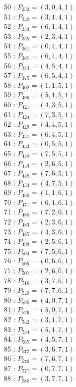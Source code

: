 \documentclass{article}
\begin{document}
{\begin{multicols}{3}
50 : $P_{332}=( 3, 0, 4, 1 )$\\
51 : $P_{340}=( 3, 1, 4, 1 )$\\
52 : $P_{343}=( 6, 1, 4, 1 )$\\
53 : $P_{355}=( 2, 3, 4, 1 )$\\
54 : $P_{361}=( 0, 4, 4, 1 )$\\
55 : $P_{367}=( 6, 4, 4, 1 )$\\
56 : $P_{373}=( 4, 5, 4, 1 )$\\
57 : $P_{375}=( 6, 5, 4, 1 )$\\
58 : $P_{402}=( 1, 1, 5, 1 )$\\
59 : $P_{406}=( 5, 1, 5, 1 )$\\
60 : $P_{421}=( 4, 3, 5, 1 )$\\
61 : $P_{424}=( 7, 3, 5, 1 )$\\
62 : $P_{429}=( 4, 4, 5, 1 )$\\
63 : $P_{431}=( 6, 4, 5, 1 )$\\
64 : $P_{433}=( 0, 5, 5, 1 )$\\
65 : $P_{440}=( 7, 5, 5, 1 )$\\
66 : $P_{443}=( 2, 6, 5, 1 )$\\
67 : $P_{448}=( 7, 6, 5, 1 )$\\
68 : $P_{453}=( 4, 7, 5, 1 )$\\
69 : $P_{466}=( 1, 1, 6, 1 )$\\
70 : $P_{471}=( 6, 1, 6, 1 )$\\
71 : $P_{480}=( 7, 2, 6, 1 )$\\
72 : $P_{483}=( 2, 3, 6, 1 )$\\
73 : $P_{485}=( 4, 3, 6, 1 )$\\
74 : $P_{499}=( 2, 5, 6, 1 )$\\
75 : $P_{504}=( 7, 5, 6, 1 )$\\
76 : $P_{505}=( 0, 6, 6, 1 )$\\
77 : $P_{507}=( 2, 6, 6, 1 )$\\
78 : $P_{516}=( 3, 7, 6, 1 )$\\
79 : $P_{520}=( 7, 7, 6, 1 )$\\
80 : $P_{525}=( 4, 0, 7, 1 )$\\
81 : $P_{526}=( 5, 0, 7, 1 )$\\
82 : $P_{532}=( 3, 1, 7, 1 )$\\
83 : $P_{534}=( 5, 1, 7, 1 )$\\
84 : $P_{565}=( 4, 5, 7, 1 )$\\
85 : $P_{572}=( 3, 6, 7, 1 )$\\
86 : $P_{576}=( 7, 6, 7, 1 )$\\
87 : $P_{577}=( 0, 7, 7, 1 )$\\
88 : $P_{580}=( 3, 7, 7, 1 )$\\
\end{multicols}


}
\end{document}
